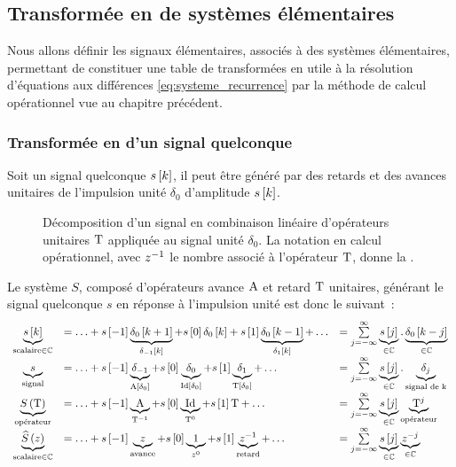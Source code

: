 \subsection{Transformée en \tZ{} de systèmes élémentaires}
\label{sec:transformee_en_z}
Nous allons définir les signaux élémentaires, associés à des systèmes
élémentaires, permettant de constituer une table de transformées en
\tZ{} utile à la résolution d'équations aux différences
\eqref{eq:systeme_recurrence} par la méthode de calcul opérationnel
vue au chapitre précédent.

\subsubsection{Transformée en \tZ{} d'un signal quelconque}

Soit un signal quelconque $s\left[k\right]$, il peut être généré par des
retards et des avances unitaires de l'impulsion unité $\delta_0$
d'amplitude $s\left[k\right]$.

\begin{figure}[ht!]
  \centering
  \caption{Décomposition d'un signal en combinaison linéaire
    d'opérateurs unitaires $\mathrm{T}$ appliquée au signal unité
    $\delta_0$. La notation en calcul opérationnel, avec $z^{-1}$ le
    nombre associé à l'opérateur $\mathrm{T}$, donne la \teZ.}
  \label{fig:decomposition_unite}
\end{figure}
Le système $S$, composé d'opérateurs avance
$\mathrm{A}$ et retard $\mathrm{T}$ unitaires, générant le signal quelconque
$s$ en réponse à l'impulsion unité est donc le suivant~:
\begin{equation}
  \label{eq:decomposition_unite}
  \begin{array}{cll}
    \underbrace{s\left[k\right]}_{\text{scalaire}\in\mathbb{C}} &= \ldots +  s\left[-1\right] \underbrace{\delta_0\left[k+1\right]}_{\delta_{-1}\left[k\right]} + s\left[0\right] \delta_0\left[k\right] + s\left[1\right] \underbrace{\delta_0\left[k-1\right]}_{\delta_1\left[k\right]} + \ldots &= \sum\limits_{j=-\infty}^{\infty}{\underbrace{s\left[j\right]}_{\in\mathbb{C}}.\underbrace{\delta_0\left[k-j\right]}_{\in\mathbb{C}}} \\
    \underbrace{s}_{\text{signal}} &= \ldots +  s\left[-1\right] \underbrace{\delta_{-1}}_{\mathrm{A}\left[\delta_0\right]} + s\left[0\right] \underbrace{\delta_0}_{\mathrm{Id}\left[\delta_0\right]} + s\left[1\right] \underbrace{\delta_{1}}_{\mathrm{T}\left[\delta_0\right]} +  \ldots &= \sum\limits_{j=-\infty}^{\infty}{\underbrace{s\left[j\right]}_{\in\mathbb{C}}.\underbrace{\delta_{j}}_{\text{signal de k}}} \\
    \underbrace{S\left(\mathrm{T}\right)}_{\text{opérateur}} &= \ldots + s\left[-1\right] \underbrace{\mathrm{A}}_{\mathrm{T}^{-1}} + s\left[0\right]
                                            \underbrace{\mathrm{Id}}_{\mathrm{T}^0} + s\left[1\right] \mathrm{T} + \ldots &= \sum\limits_{j=-\infty}^{\infty}{\underbrace{s\left[j\right]}_{\in\mathbb{C}}\underbrace{\mathrm{T}^{j}}_{\text{opérateur}}}\\
    \underbrace{\widehat{S}\left(z\right)}_{\text{scalaire}\in\mathbb{C}} &= \ldots + s\left[-1\right] \underbrace{z}_{\text{avance}} + s\left[0\right]
    \underbrace{1}_{z^0} + s\left[1\right] \underbrace{z^{-1}}_{\text{retard}}+ \ldots &= \sum\limits_{j=-\infty}^{\infty}{\underbrace{s\left[j\right]}_{\in\mathbb{C}}\underbrace{z^{-j}}_{\in\mathbb{C}}}   
  \end{array}
\end{equation}


